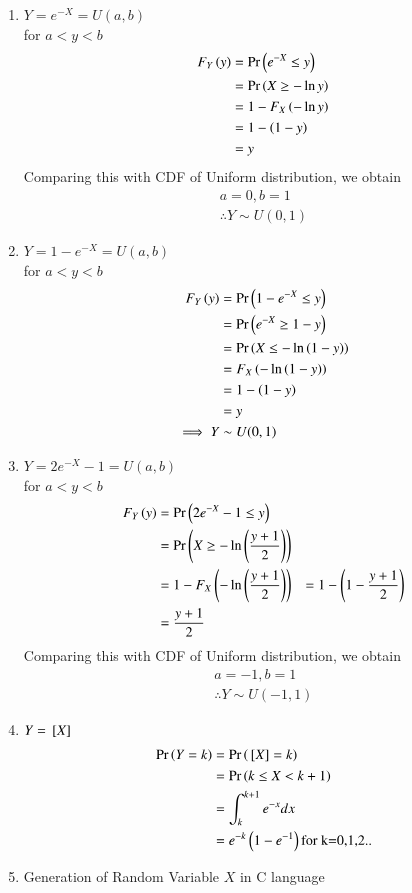 \documentclass[book,11pt]{IEEEtran}
\begin{document}
\begin{enumerate}[label=(\Alph*)]
\item $Y=e^{-X}=U(a,b)$\\
for $a<y<b$ 
\begin{align}
F_Y\left(y\right)&=\Pr\left(e^{-X}\le y\right)\\
&=\Pr\left(X\ge -\ln y\right)\\
&=1-F_X\left(-\ln y\right)\\
&=1-\left(1-y\right)\\
&=y
\end{align}
Comparing this with CDF of Uniform distribution, we obtain
\begin{align}
a=0,b=1\\
\therefore Y\sim U(0,1)
\end{align}
\item $Y=1-e^{-X}=U(a,b)$\\
for $a<y<b$ 
\begin{align}
F_Y\left(y\right)&=\Pr\left(1-e^{-X}\le y\right)\\
&=\Pr\left(e^{-X}\ge 1-y\right)\\
&=\Pr\left(X \le -\ln\left(1-y\right)\right)\\
&=F_X\left(-\ln\left(1-y\right)\right)\\
&=1-\left(1-y\right)\\
&=y\\
\implies Y&\sim U(0,1)
\end{align}
\item $Y=2e^{-X}-1=U(a,b)$\\
for $a<y<b$ 
\begin{align}
F_Y\left(y\right)&=\Pr\left(2e^{-X}-1\le y\right)\\
&=\Pr\left(X\ge -\ln\left(\frac{y+1}{2}\right)\right)\\
&=1-F_X\left(-\ln\left(\frac{y+1}{2}\right)\right)
&=1-\left(1-\frac{y+1}{2}\right)\\
&=\frac{y+1}{2}
\end{align}
Comparing this with CDF of Uniform distribution, we obtain
\begin{align}
a=-1,b=1\\
\therefore Y\sim U(-1,1)
\end{align}
\item $Y={}\left[X\right]$
\begin{align}
\Pr\left(Y=k\right)&=\Pr\left({}\left[X\right]=k\right)\\
&=\Pr\left(k\le X<k+1\right)\\
&=\int_{k}^{k+1}e^{-x}dx\\
&=e^{-k}\left(1-e^{-1}\right) \text{for k=0,1,2..}
\end{align}
\item Generation of Random Variable $X$ in C language

\end{enumerate}
\end{document}

